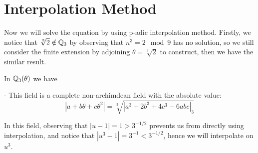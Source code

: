 \section{Interpolation Method}

Now we will solve the equation by using p-adic interpolation method. Firstly, we notice that \(\sqrt[3]{2} \notin \mathbb{Q}_3\) by observing that \(n^3 = 2 \mod 9\) has no solution, so we still consider the finite extension by adjoining \(\theta = \sqrt[3]{2}\) to construct, then we have the similar result.

\begin{proposition}
    In \(\mathbb{Q}_3 (\theta)\) we have

    - This field is a complete non-archimdean field with the absolute value:
    \[|a+b\theta+c\theta^2| = \sqrt[3]{|a^3+2b^3+4c^3-6abc|_3}\]
\end{proposition}

    In this field, observing that \(|u-1| =1 > 3^{-1/2}\) prevents us from directly using interpolation, and notice that \(|u^3-1| = 3^{-1} < 3^{-1/2}\), hence we will interpolate on \(u^3\).

